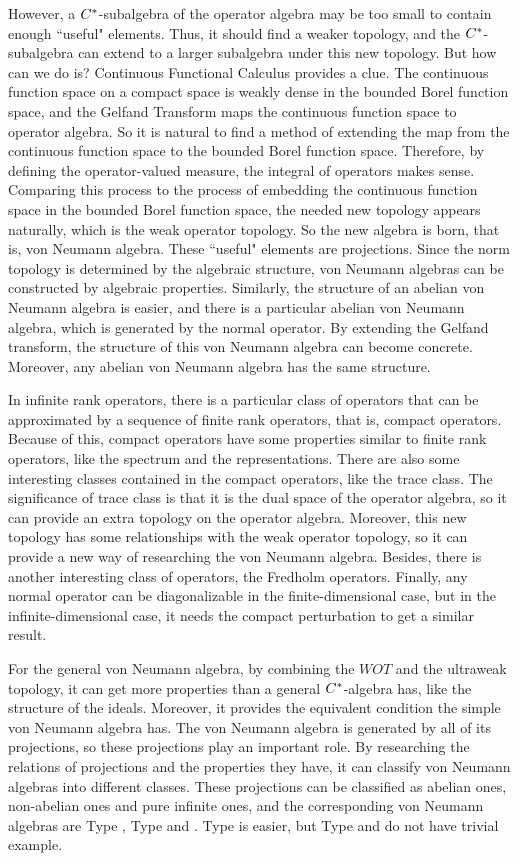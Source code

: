 However, a $C^{*}$-subalgebra of the operator algebra may be too small to contain enough ``useful" elements. Thus, it should find a weaker topology, and the $C^{*}$-subalgebra can extend to a larger subalgebra under this new topology. But how can we do is? Continuous Functional Calculus provides a clue. The continuous function space on a compact space is weakly dense in the bounded Borel function space, and the Gelfand Transform maps the continuous function space to operator algebra. So it is natural to find a method of extending the map from the continuous function space to the bounded Borel function space. Therefore, by defining the operator-valued measure, the integral of operators makes sense. Comparing this process to the process of embedding the continuous function space in the bounded Borel function space, the needed new topology appears naturally, which is the weak operator topology. So the new algebra is born, that is, von Neumann algebra. These ``useful" elements are projections. Since the norm topology is determined by the algebraic structure,  von Neumann algebras can be constructed by algebraic properties. Similarly, the structure of an abelian von Neumann algebra is easier, and there is a particular abelian von Neumann algebra, which is generated by the normal operator. By extending the Gelfand transform, the structure of this von Neumann algebra can become concrete. Moreover, any abelian von Neumann algebra has the same structure.

In infinite rank operators, there is a particular class of operators that can be approximated by a sequence of finite rank operators, that is, compact operators. Because of this, compact operators have some properties similar to finite rank operators, like the spectrum and the representations. There are also some interesting classes contained in the compact operators, like the trace class. The significance of trace class is that it is the dual space of the operator algebra, so it can provide an extra topology on the operator algebra. Moreover, this new topology has some relationships with the weak operator topology, so it can provide a new way of researching the von Neumann algebra. Besides, there is another interesting class of operators, the Fredholm operators. Finally, any normal operator can be diagonalizable in the finite-dimensional case, but in the infinite-dimensional case, it needs the compact perturbation to get a similar result. 

For the general von Neumann algebra, by combining the $WOT$ and the ultraweak topology, it can get more properties than a general $C^{*}$-algebra has, like the structure of the ideals. Moreover, it provides the equivalent condition the simple von Neumann algebra has. The von Neumann algebra is generated by all of its projections, so these projections play an important role. By researching the relations of projections and the properties they have, it can classify von Neumann algebras into different classes. These projections can be classified as abelian ones, non-abelian ones and pure infinite ones, and the corresponding von Neumann algebras are Type , Type  and . Type  is easier, but Type  and  do not have trivial example.

